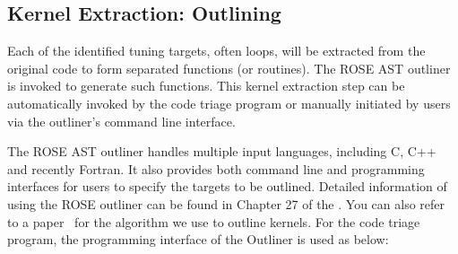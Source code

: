 %
%
%
%

\subsection{Kernel Extraction: Outlining}
Each of the identified tuning targets, often loops, will be extracted from the original code to
form separated functions (or routines). 
The ROSE AST outliner is invoked to generate such functions. 
This kernel extraction step can be automatically invoked by the code triage
program or manually initiated by users via the outliner's command line
interface. 

The ROSE AST outliner handles multiple input languages, including C, C++ and
recently Fortran.  It also provides both command line and programming interfaces for users
to specify the targets to be outlined.  
Detailed information of using the ROSE outliner can be found in
Chapter 27 of the .
You can also refer to a paper~\cite{LiaoEffective2009} for the algorithm we use to outline kernels. 
For the code triage program, the programming interface of the Outliner is
used as below:

